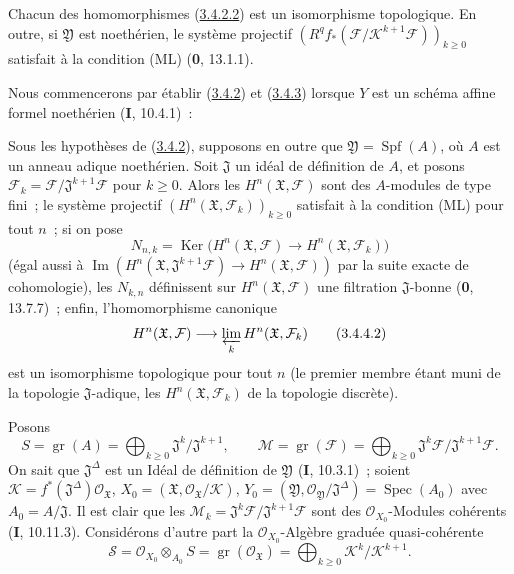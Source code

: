 \begin{corollary}[3.4.3]
\label{III.3.4.3-fr}
Chacun des homomorphismes (\hyperref[III.3.4.2.2-fr]{3.4.2.2}) est un
isomorphisme topologique. En outre, si $\mathfrak Y$ est noethérien, le
système projectif
$(R^qf_*(\mathcal F/\mathcal K^{k+1}\mathcal F))_{k\geq0}$ satisfait à la
condition \textup{(ML)} (\textbf{0}, 13.1.1).
\end{corollary}

Nous commencerons par établir (\hyperref[III.3.4.2-fr]{3.4.2}) et
(\hyperref[III.3.4.3-fr]{3.4.3}) lorsque $Y$ est un schéma affine
formel noethérien (\textbf{I}, 10.4.1)~:

\begin{corollary}[3.4.4]
\label{III.3.4.4-fr}
Sous les hypothèses de (\hyperref[III.3.4.2-fr]{3.4.2}), supposons en outre
que $\mathfrak Y=\operatorname{Spf}(A)$, où $A$ est un anneau adique
noethérien. Soit $\mathfrak J$ un idéal de définition de $A$, et posons
$\mathcal F_k=\mathcal F/\mathfrak J^{k+1}\mathcal F$ pour $k\geq0$. Alors
les $H^n(\mathfrak X,\mathcal F)$ sont des $A$-modules de type fini~; le
système projectif $(H^n(\mathfrak X,\mathcal F_k))_{k\geq0}$ satisfait à la
condition \textup{(ML)} pour tout $n$~; si on pose
\[
N_{n,k}=\operatorname{Ker}\bigl(H^n(\mathfrak X,\mathcal F)
\longrightarrow H^n(\mathfrak X,\mathcal F_k)\bigr)
\tag{3.4.4.1}\label{III.3.4.4.1-fr}
\]
(égal aussi à
$\operatorname{Im}(H^n(\mathfrak X,\mathfrak J^{k+1}\mathcal F)
\to H^n(\mathfrak X,\mathcal F))$ par la suite exacte de cohomologie), les
$N_{k,n}$ définissent sur $H^n(\mathfrak X,\mathcal F)$ une filtration
$\mathfrak J$-bonne (\textbf{0}, 13.7.7)~; enfin, l'homomorphisme canonique
\[
H^n(\mathfrak X,\mathcal F)
\longrightarrow\varprojlim_kH^n(\mathfrak X,\mathcal F_k)
\tag{3.4.4.2}\label{III.3.4.4.2-fr}
\]
est un isomorphisme topologique pour tout $n$ (le premier membre étant muni
de la topologie $\mathfrak J$-adique, les $H^n(\mathfrak X,\mathcal F_k)$ de
la topologie discrète).
\end{corollary}

Posons
\[
S=\operatorname{gr}(A)=\bigoplus_{k\geq0}
\mathfrak J^k/\mathfrak J^{k+1},\qquad
\mathcal M=\operatorname{gr}(\mathcal F)=\bigoplus_{k\geq0}
\mathfrak J^k\mathcal F/\mathfrak J^{k+1}\mathcal F.
\tag{3.4.4.3}\label{III.3.4.4.3-fr}
\]
On sait que $\mathfrak J^\Delta$ est un Idéal de définition de $\mathfrak Y$
(\textbf{I}, 10.3.1)~; soient
$\mathcal K=f^*(\mathfrak J^\Delta)\mathcal O_{\mathfrak X}$,
$X_0=(\mathfrak X,\mathcal O_{\mathfrak X}/\mathcal K)$,
$Y_0=(\mathfrak Y,\mathcal O_{\mathfrak Y}/\mathfrak J^\Delta)
=\operatorname{Spec}(A_0)$ avec $A_0=A/\mathfrak J$. Il est clair que les
$\mathcal M_k=\mathfrak J^k\mathcal F/\mathfrak J^{k+1}\mathcal F$ sont des
$\mathcal O_{X_0}$-Modules cohérents (\textbf{I}, 10.11.3). Considérons d'autre part la
$\mathcal O_{X_0}$-Algèbre graduée quasi-cohérente
\[
\mathcal S=\mathcal O_{X_0}\otimes_{A_0}S
=\operatorname{gr}(\mathcal O_{\mathfrak X})
=\bigoplus_{k\geq0}\mathcal K^k/\mathcal K^{k+1}.
\tag{3.4.4.4}\label{III.3.4.4.4-fr}
\]

